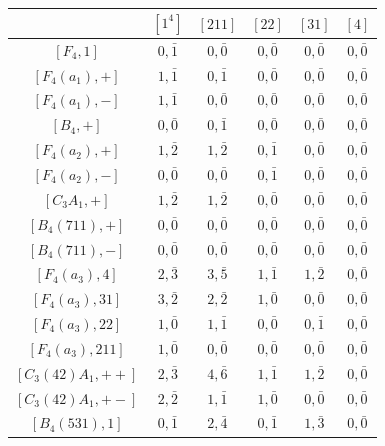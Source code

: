 \begin{landscape}
    \begin{table}[h]
        \centering
        \begin{minipage}{0.40\textwidth}
            \centering
            \begin{tabular}{|c|ccccc|}
                \hline
                & $[1^4]$ & $[211]$ & $[22]$ & $[31]$ & $[4]$ \\\hline
                $[F_4,1]$ & $0,\bar1$ & $0,\bar0$ & $0,\bar0$ & $0,\bar0$ & $0,\bar0$ \\\hline
                $[F_4(a_1),+]$ & $1,\bar1$ & $0,\bar1$ & $0,\bar0$ & $0,\bar0$ & $0,\bar0$ \\
                $[F_4(a_1),-]$ & $1,\bar1$ & $0,\bar0$ & $0,\bar0$ & $0,\bar0$ & $0,\bar0$ \\
                $[B_4,+]$ & $0,\bar0$ & $0,\bar1$ & $0,\bar0$ & $0,\bar0$ & $0,\bar0$ \\\hline
                $[F_4(a_2),+]$ & $1,\bar2$ & $1,\bar2$ & $0,\bar1$ & $0,\bar0$ & $0,\bar0$ \\
                $[F_4(a_2),-]$ & $0,\bar0$ & $0,\bar0$ & $0,\bar1$ & $0,\bar0$ & $0,\bar0$ \\
                $[C_3A_1,+]$ & $1,\bar2$ & $1,\bar2$ & $0,\bar0$ & $0,\bar0$ & $0,\bar0$ \\\hline
                $[B_4(711),+]$ & $0,\bar0$ & $0,\bar0$ & $0,\bar0$ & $0,\bar0$ & $0,\bar0$ \\
                $[B_4(711),-]$ & $0,\bar0$ & $0,\bar0$ & $0,\bar0$ & $0,\bar0$ & $0,\bar0$ \\\hline
                $[F_4(a_3),4]$ & $2,\bar{3}$ & $3,\bar{5}$ & $1,\bar1$ & $1,\bar2$ & $0,\bar0$ \\
                $[F_4(a_3),31]$ & $3,\bar2$ & $2,\bar2$ & $1,\bar0$ & $0,\bar0$ & $0,\bar0$ \\
                $[F_4(a_3),22]$ & $1,\bar0$ & $1,\bar1$ & $0,\bar0$ & $0,\bar1$ & $0,\bar0$ \\
                $[F_4(a_3),211]$ & $1,\bar0$ & $0,\bar0$ & $0,\bar0$ & $0,\bar0$ & $0,\bar0$ \\
                $[C_3(42)A_1,++]$ & $2,\bar{3}$ & $4,\bar{6}$ & $1,\bar1$ & $1,\bar2$ & $0,\bar0$ \\
                $[C_3(42)A_1,+-]$ & $2,\bar2$ & $1,\bar1$ & $1,\bar0$ & $0,\bar0$ & $0,\bar0$ \\
                $[B_4(531),1]$ & $0,\bar1$ & $2,\bar{4}$ & $0,\bar1$ & $1,\bar{3}$ & $0,\bar0$ \\

\end{tabular}
\end{minipage}
\end{table}
\end{landscape}
